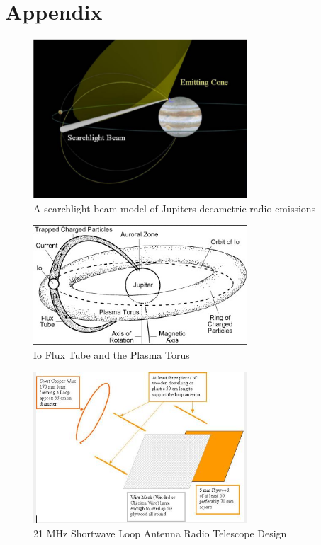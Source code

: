 \documentclass[runningheads,a4paper]{llncs}
\begin{document}
\chapter*{Appendix}

%
\begin{figure}[here]
\centering
\includegraphics[width=8cm]{images/12}
\caption{A searchlight beam model of Jupiters decametric radio emissions \citep{imai-08}}
\label{fig:decametric_emissions_searchlight}
\end{figure}
%

%
\begin{figure}[here]
\centering
\includegraphics[width=8cm]{images/13}
\caption{Io Flux Tube and the Plasma Torus \citep{lang-10}}
\label{fig:io_flux_tube_plasma_torus}
\end{figure}
%

%
\begin{figure}[here]
\centering
\includegraphics[width=8cm]{images/14}
\caption{21 MHz Shortwave Loop Antenna Radio Telescope Design \citep{greef-12}}
\label{fig:loop_antenna_design_a}
\end{figure}
%
\end{document}
